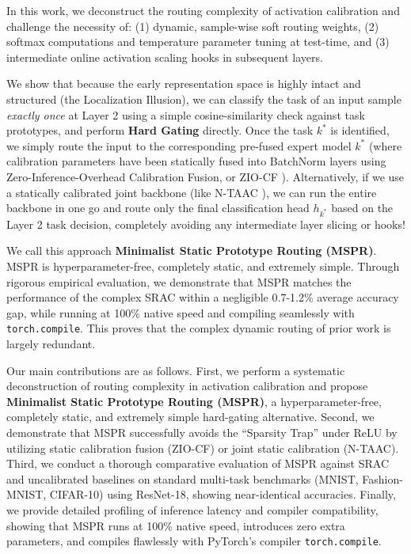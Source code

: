 \documentclass{article}
\theoremstyle{plain}
\theoremstyle{definition}
\theoremstyle{remark}
\begin{document}
In this work, we deconstruct the routing complexity of activation calibration and challenge the necessity of: (1) dynamic, sample-wise soft routing weights, (2) softmax computations and temperature parameter tuning at test-time, and (3) intermediate online activation scaling hooks in subsequent layers.

We show that because the early representation space is highly intact and structured (the Localization Illusion), we can classify the task of an input sample \textit{exactly once} at Layer 2 using a simple cosine-similarity check against task prototypes, and perform \textbf{Hard Gating} directly. Once the task $k^*$ is identified, we simply route the input to the corresponding pre-fused expert model $k^*$ (where calibration parameters have been statically fused into BatchNorm layers using Zero-Inference-Overhead Calibration Fusion, or ZIO-CF \cite{Authors2026c}). Alternatively, if we use a statically calibrated joint backbone (like N-TAAC \cite{Authors2026b}), we can run the entire backbone in one go and route only the final classification head $h_{k^*}$ based on the Layer 2 task decision, completely avoiding any intermediate layer slicing or hooks!

We call this approach \textbf{Minimalist Static Prototype Routing (MSPR)}. MSPR is hyperparameter-free, completely static, and extremely simple. Through rigorous empirical evaluation, we demonstrate that MSPR matches the performance of the complex SRAC within a negligible 0.7-1.2\% average accuracy gap, while running at 100\% native speed and compiling seamlessly with \texttt{torch.compile}. This proves that the complex dynamic routing of prior work is largely redundant.

Our main contributions are as follows. First, we perform a systematic deconstruction of routing complexity in activation calibration and propose \textbf{Minimalist Static Prototype Routing (MSPR)}, a hyperparameter-free, completely static, and extremely simple hard-gating alternative. Second, we demonstrate that MSPR successfully avoids the ``Sparsity Trap'' under ReLU by utilizing static calibration fusion (ZIO-CF) or joint static calibration (N-TAAC). Third, we conduct a thorough comparative evaluation of MSPR against SRAC and uncalibrated baselines on standard multi-task benchmarks (MNIST, Fashion-MNIST, CIFAR-10) using ResNet-18, showing near-identical accuracies. Finally, we provide detailed profiling of inference latency and compiler compatibility, showing that MSPR runs at 100\% native speed, introduces zero extra parameters, and compiles flawlessly with PyTorch's compiler \texttt{torch.compile}.
\end{document}
